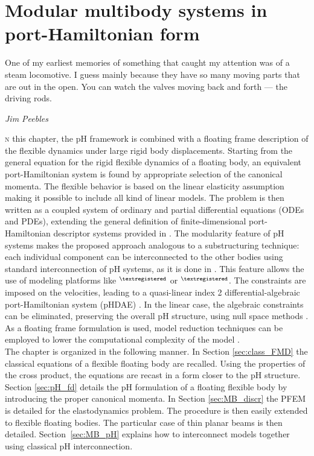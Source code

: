 \chapter{Modular multibody systems in port-Hamiltonian form}

\epigraph{One of my earliest memories of something that caught my attention was of a steam locomotive. I guess mainly because they have so many moving parts that are out in the open. You can watch the valves moving back and forth — the driving rods.}{\textit{Jim Peebles}}

\minitoc

\lettrine{\color{theme}{I}}n this chapter, the pH framework is combined with a floating frame description of the flexible dynamics under large rigid body displacements. Starting from the general equation for the rigid flexible dynamics of a floating body, an equivalent port-Hamiltonian system is found by appropriate selection of the canonical momenta. The flexible behavior is based on the linear elasticity assumption making it possible to include all kind of linear models. The problem is then written as a coupled system of ordinary and partial differential equations (ODEs and PDEs), extending the general definition of finite-dimensional port-Hamiltonian descriptor systems provided in \cite{mehrmann2019structurepreserving}. The modularity feature of pH systems makes the proposed approach analogous to a substructuring technique: each individual component can be interconnected to the other bodies using standard interconnection of pH systems, as it is done in \cite{macchelli2007link}. This feature allows the use of modeling platforms like {}$^{\tiny{\textregistered}}$ or {}$^{\tiny{\textregistered}}$.  The constraints are imposed on the velocities, leading to a quasi-linear index 2 differential-algebraic port-Hamiltonian system (pHDAE) \cite{steinbrecher2006phd,beattie2018linear}. In the linear case, the algebraic constraints can be eliminated, preserving the overall pH structure, using null space methods \cite{leyendecker2008nullspace}.  As a floating frame formulation is used, model reduction techniques can be employed to lower the computational complexity of the model \cite{chaturantabut2016,egger2018}.  \\


\indent The chapter is organized in the following manner. In Section \ref{sec:class_FMD} the classical equations of a flexible floating body are recalled. Using the properties of the cross product, the equations are recast in a form closer to the pH structure. Section \ref{sec:pH_fd} details the pH formulation of a floating flexible body by introducing the proper canonical momenta. In Section \ref{sec:MB_discr} the PFEM is detailed for the elastodynamics problem. The procedure is then easily extended to flexible floating bodies. The particular case of thin planar beams is then detailed. Section~\ref{sec:MB_pH} explains how to interconnect models together using classical pH interconnection. 

